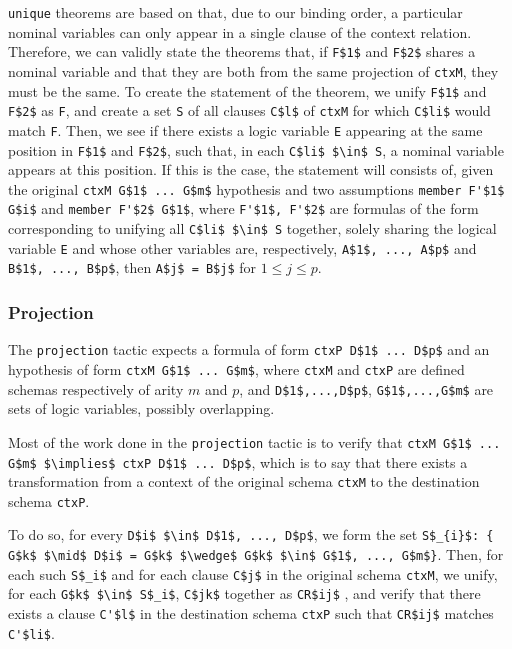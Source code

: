 \documentclass[nocopyrightspace,authoryear]{sigplanconf}
\begin{document}
\lstinline|unique| theorems are based on that, due to our binding order, a particular nominal variables can only appear in a single clause of the context relation. Therefore, we can validly state the theorems that, if \lstinline|F$1$| and \lstinline|F$2$| shares a nominal variable and that they are both from the same projection of \lstinline|ctxM|, they must be the same. To create the statement of the theorem, we unify \lstinline|F$1$| and \lstinline|F$2$| as \lstinline|F|, and create a set \lstinline|S| of all clauses \lstinline|C$l$| of \lstinline|ctxM| for which \lstinline|C$li$| would match \lstinline|F|. Then, we see if there exists a logic variable \lstinline|E| appearing at the same position in \lstinline|F$1$| and \lstinline|F$2$|, such that, in each \lstinline|C$li$ $\in$ S|, a nominal variable appears at this position. If this is the case, the statement will consists of, given the original \lstinline|ctxM G$1$ ... G$m$| hypothesis and two assumptions \lstinline|member F'$1$ G$i$| and \lstinline|member F'$2$ G$1$|, where \lstinline|F'$1$, F'$2$| are formulas of the form corresponding to unifying all \lstinline|C$li$ $\in$ S| together, solely sharing the logical variable \lstinline|E| and whose other variables are, respectively, \lstinline|A$1$, ..., A$p$| and \lstinline|B$1$, ..., B$p$|, then \lstinline|A$j$ = B$j$| for $1 \leq j \leq p$.



\subsubsection{Projection}
The \lstinline|projection| tactic expects a formula of form \lstinline|ctxP D$1$ ... D$p$| and an hypothesis of form \lstinline|ctxM G$1$ ... G$m$|, where \lstinline|ctxM| and \lstinline|ctxP| are defined schemas respectively of arity $m$ and $p$, and \lstinline|D$1$,...,D$p$|, \lstinline|G$1$,...,G$m$| are sets of logic variables, possibly overlapping.

Most of the work done in the \lstinline|projection| tactic is to verify that \lstinline|ctxM G$1$ ... G$m$ $\implies$ ctxP D$1$ ... D$p$|, which is to say that there exists a transformation from a context of the original schema \lstinline|ctxM| to the destination schema \lstinline|ctxP|.

To do so, for every \lstinline|D$i$ $\in$ D$1$, ..., D$p$|, we form the set 
\lstinline|S$_{i}$: { G$k$ $\mid$ D$i$ = G$k$ $\wedge$ G$k$ $\in$ G$1$, ..., G$m$}|. 
Then, for each such \lstinline|S$_i$| and for each clause \lstinline|C$j$| in the original schema \lstinline|ctxM|, we unify, for each \lstinline|G$k$ $\in$ S$_i$|, \lstinline|C$jk$| together as \lstinline|CR$ij$| , and verify that there exists a clause \lstinline|C'$l$| in the destination schema \lstinline|ctxP| such that \lstinline|CR$ij$| matches \lstinline|C'$li$|.
\end{document}
